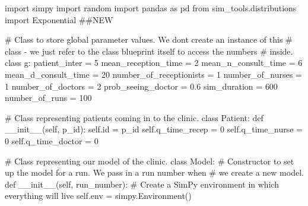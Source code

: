 \documentclass[
  letterpaper,
  DIV=11,
  numbers=noendperiod]{scrreprt}
\newenvironment{Shaded}{}{}
\newcommand{\BuiltInTok}[1]{\textcolor[rgb]{0.84,0.23,0.29}{#1}}
\newcommand{\CommentTok}[1]{\textcolor[rgb]{0.42,0.45,0.49}{#1}}
\newcommand{\DecValTok}[1]{\textcolor[rgb]{0.00,0.36,0.77}{#1}}
\newcommand{\FloatTok}[1]{\textcolor[rgb]{0.00,0.36,0.77}{#1}}
\newcommand{\FunctionTok}[1]{\textcolor[rgb]{0.44,0.26,0.76}{#1}}
\newcommand{\ImportTok}[1]{\textcolor[rgb]{0.01,0.18,0.38}{#1}}
\newcommand{\KeywordTok}[1]{\textcolor[rgb]{0.84,0.23,0.29}{#1}}
\newcommand{\NormalTok}[1]{\textcolor[rgb]{0.14,0.16,0.18}{#1}}
\newcommand{\OperatorTok}[1]{\textcolor[rgb]{0.14,0.16,0.18}{#1}}
\newcommand{\VariableTok}[1]{\textcolor[rgb]{0.89,0.38,0.04}{#1}}
\begin{document}
\begin{tcolorbox}[enhanced jigsaw, colframe=quarto-callout-note-color-frame, bottomtitle=1mm, breakable, rightrule=.15mm, coltitle=black, colbacktitle=quarto-callout-note-color!10!white, opacityback=0, leftrule=.75mm, arc=.35mm, toptitle=1mm, title=\textcolor{quarto-callout-note-color}{\faInfo}\hspace{0.5em}{Click here to view the full code}, titlerule=0mm, colback=white, toprule=.15mm, bottomrule=.15mm, left=2mm, opacitybacktitle=0.6]

\begin{Shaded}
\begin{Highlighting}[]
\ImportTok{import}\NormalTok{ simpy}
\ImportTok{import}\NormalTok{ random}
\ImportTok{import}\NormalTok{ pandas }\ImportTok{as}\NormalTok{ pd}
\ImportTok{from}\NormalTok{ sim\_tools.distributions }\ImportTok{import}\NormalTok{ Exponential }\CommentTok{\#\#NEW}

\CommentTok{\# Class to store global parameter values.  We don\textquotesingle{}t create an instance of this}
\CommentTok{\# class {-} we just refer to the class blueprint itself to access the numbers}
\CommentTok{\# inside.}
\KeywordTok{class}\NormalTok{ g:}
\NormalTok{    patient\_inter }\OperatorTok{=} \DecValTok{5}
\NormalTok{    mean\_reception\_time }\OperatorTok{=} \DecValTok{2}
\NormalTok{    mean\_n\_consult\_time }\OperatorTok{=} \DecValTok{6}
\NormalTok{    mean\_d\_consult\_time }\OperatorTok{=} \DecValTok{20}
\NormalTok{    number\_of\_receptionists }\OperatorTok{=} \DecValTok{1}
\NormalTok{    number\_of\_nurses }\OperatorTok{=} \DecValTok{1}
\NormalTok{    number\_of\_doctors }\OperatorTok{=} \DecValTok{2}
\NormalTok{    prob\_seeing\_doctor }\OperatorTok{=} \FloatTok{0.6}
\NormalTok{    sim\_duration }\OperatorTok{=} \DecValTok{600}
\NormalTok{    number\_of\_runs }\OperatorTok{=} \DecValTok{100}

\CommentTok{\# Class representing patients coming in to the clinic.}
\KeywordTok{class}\NormalTok{ Patient:}
    \KeywordTok{def} \FunctionTok{\_\_init\_\_}\NormalTok{(}\VariableTok{self}\NormalTok{, p\_id):}
        \VariableTok{self}\NormalTok{.}\BuiltInTok{id} \OperatorTok{=}\NormalTok{ p\_id}
        \VariableTok{self}\NormalTok{.q\_time\_recep }\OperatorTok{=} \DecValTok{0}
        \VariableTok{self}\NormalTok{.q\_time\_nurse }\OperatorTok{=} \DecValTok{0}
        \VariableTok{self}\NormalTok{.q\_time\_doctor }\OperatorTok{=} \DecValTok{0}

\CommentTok{\# Class representing our model of the clinic.}
\KeywordTok{class}\NormalTok{ Model:}
    \CommentTok{\# Constructor to set up the model for a run.  We pass in a run number when}
    \CommentTok{\# we create a new model.}
    \KeywordTok{def} \FunctionTok{\_\_init\_\_}\NormalTok{(}\VariableTok{self}\NormalTok{, run\_number):}
        \CommentTok{\# Create a SimPy environment in which everything will live}
        \VariableTok{self}\NormalTok{.env }\OperatorTok{=}\NormalTok{ simpy.Environment()}


\end{Highlighting}
\end{Shaded}
\end{tcolorbox}
\end{document}
